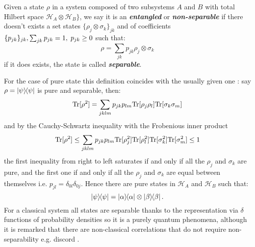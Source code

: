 \begin{definition}
  Given a state $\rho$ in a system composed of two subsystems $A$ and $B$ with total Hilbert space $\mathcal{H}_{A}\otimes \mathcal{H}_{B}\}$, we say it is
  an \textbf{\textit{entangled}} or \textit{\textbf{non-separable}} if there doesn't exists a set states $\{\rho_{j}\otimes \sigma_{k}\}_{jk}$ and of coefficients
  $\{p_{jk}\}_{jk},  \sum_{jk}p_{jk}=1, \hspace{0.1cm} p_{jk}\geq 0$ such that:
  \begin{equation}
    \rho = \sum_{jk}p_{jk}\rho_{j}\otimes \sigma_{k}
  \end{equation}
  if it does exists, the state is called \textbf{\textit{separable}}.
\end{definition}
For the case of pure state this definition coincides with the usually given one \cite{nielsen_quantum_2010}: say $\rho=\ketbra{\psi}$ is pure and separable,
then:
\begin{equation}
  \mathrm{Tr}[\rho^{2}] = \sum_{jklm}p_{jk}p_{lm}\mathrm{Tr}[\rho_{j}\rho_{l}]\mathrm{Tr}[\sigma_{k}\sigma_{m}]
\end{equation}
and by the Cauchy-Schwartz inequality with the Frobenious inner product
\begin{equation}
  \mathrm{Tr}[\rho^{2}] \leq \sum_{jklm}p_{jk}p_{lm}\mathrm{Tr}[\rho_{j}^{2}]\mathrm{Tr}[\rho_{l}^{2}]\mathrm{Tr}[\sigma_{k}^{2}]\mathrm{Tr}[\sigma_{m}^{2}] \leq 1
\end{equation}
the first inequality from right to left saturates if and only if all the $\rho_{j}$ and $\sigma_{k}$ are pure, and the first one if
and only if all the $\rho_{j}$ and $\sigma_{k}$ are equal between themselves i.e. $p_{jl}=\delta_{0l}\delta_{0j}$. Hence there are pure states
in $\mathcal{H}_{A}$ and $\mathcal{H}_{B}$ such that:
\begin{equation}
  \ketbra{\psi} = \ketbra{\alpha}\otimes\ketbra{\beta}.
\end{equation}
For a classical system all states are separable thanks to the representation via $\delta$ functions
of probability densities \cite{diosi_short_2011} so it is a purely quantum phenomena, although it is remarked that there are non-classical
correlations that do not require non-separability e.g. discord \cite{adesso2016introduction}.

